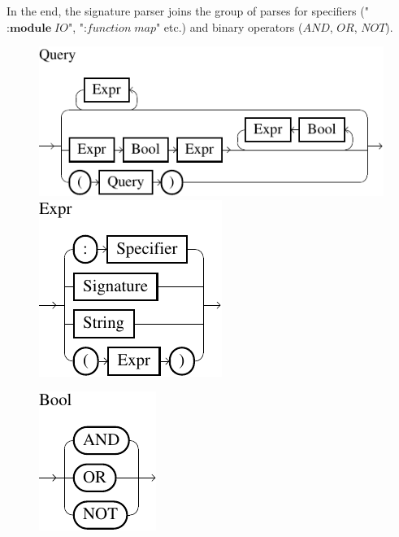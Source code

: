 \documentclass[%
	latex,%
	a4paper,%
	oneside,%
	chapterprefix,%
	headsepline,%
	12pt%
]{scrbook}
\newcommand{\textss}[1]{"#1"}
\newcommand{\Conid}[1]{\mathit{#1}}
\newcommand{\Varid}[1]{\mathit{#1}}
\begin{document}
In the end, the signature parser joins the group of parses for
specifiers (\textss{\ensuremath{\mathbin{:}\mathbf{module}\;\Conid{IO}}}, \textss{\ensuremath{\mathbin{:}\Varid{function}\;\Varid{map}}} etc.) and
binary operators (\ensuremath{\Conid{AND}}, \ensuremath{\Conid{OR}}, \ensuremath{\Conid{NOT}}). %

\begin{figure}[h!]
\begin{minipage}{0.85\textwidth}
\includegraphics{bilder/Query}
\hspace{0.4cm}
\includegraphics{bilder/Expr}
\end{minipage}
\hspace{-0.5cm}
\begin{minipage}{0.15\textwidth}
\vspace{-.7cm}
\includegraphics{bilder/Bool}
\end{minipage}
\end{figure}
\end{document}
